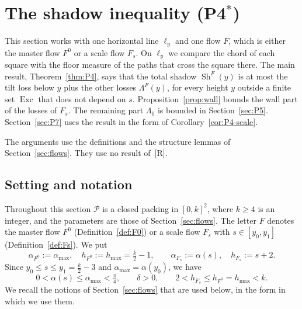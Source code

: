 \documentclass[11pt]{amsart}
\newcommand{\cP}{\mathcal P}
\newcommand{\Sh}{\operatorname{Sh}}
\newcommand{\Exc}{\operatorname{Exc}}
\newcommand{\amax}{\alpha_{\max}}
\newcommand{\hmax}{h_{\max}}
\newcommand{\Lam}{\Lambda}
\newcommand{\Fz}{F^{0}}
\newcommand{\Fs}{F_{s}}
\theoremstyle{definition}
\theoremstyle{remark}
\numberwithin{equation}{section}
\begin{document}
\section{The shadow inequality (\texorpdfstring{P4$^*$}{P4*})}\label{sec:P4}

This section works with one horizontal line $\ell_y$ and one flow $F$, which is either the master flow $\Fz$ or a scale flow $\Fs$. On $\ell_y$ we compare the chord of each square with the floor measure of the paths that cross the square there. The main result, Theorem~\ref{thm:P4}, says that the total shadow $\Sh^F(y)$ is at most the tilt loss below $y$ plus the other losses $\Lam^F(y)$, for every height $y$ outside a finite set $\Exc$ that does not depend on $s$. Proposition~\ref{prop:wall} bounds the wall part of the losses of $\Fs$. The remaining part $\Lam_0$ is bounded in Section~\ref{sec:P5}. Section~\ref{sec:P7} uses the result in the form of Corollary~\ref{cor:P4-scale}.

The arguments use the definitions and the structure lemmas of Section~\ref{sec:flows}. They use no result of~[R].

\subsection{Setting and notation}\label{ssec:P4-notation}

Throughout this section $\cP$ is a closed packing in $[0,k]^2$, where $k\ge4$ is an integer, and the parameters are those of Section~\ref{sec:flows}. The letter $F$ denotes the master flow $\Fz$ (Definition~\ref{def:F0}) or a scale flow $\Fs$ with $s\in[y_0,y_1]$ (Definition~\ref{def:Fs}). We put
\[
\alpha_{\Fz}:=\amax,\quad h_{\Fz}:=\hmax=\tfrac k2-1,\qquad \alpha_{\Fs}:=\alpha(s),\quad h_{\Fs}:=s+2 .
\]
Since $y_0\le s\le y_1=\frac k2-3$ and $\amax=\alpha(y_0)$, we have
\begin{equation}\label{eq:P4-param}
0<\alpha(s)\le\amax<\tfrac\pi4,\qquad \delta>0,\qquad 2<h_{\Fs}\le h_{\Fz}=\hmax<k .
\end{equation}
We recall the notions of Section~\ref{sec:flows} that are used below, in the form in which we use them.
\end{document}
